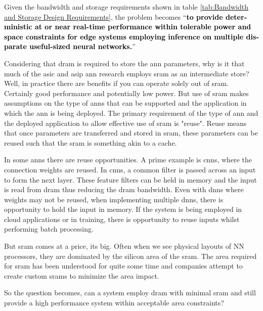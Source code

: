 Given the bandwidth and storage requirements shown in table \ref{tab:Bandwidth and Storage Design Requirements}, 
the problem becomes \hyphenquote{american}{\textbf{\textcolor{black}{to provide deterministic at or near real-time performance within tolerable power and space constraints for edge systems employing inference on multiple disparate useful-sized neural networks.}}}

\iffalse
Considering that \ac{dram} is required to store the \ac{ann} parameters, why is it that much of the \ac{asic} and \ac{asip} \ac{ann} research employs \ac{sram} as an intermediate store? Well, in practice there are benefits if you can operate solely out of \ac{sram}.
Certainly good performance and potentially low power.
But use of \ac{sram} makes assumptions on the type of \acp{ann} that can be supported and the application in which the \ac{ann} is being deployed.
The primary requirement of the type of \ac{ann} and the deployed application to allow effective use of \ac{sram} is "reuse". Reuse means that once parameters are transferred and stored in \ac{sram}, these parameters can be reused such that the \ac{sram} \iffalse isn't simply an intermediate memory but \fi is something akin to a cache.

In some \ac{ann}s there are reuse opportunities. A prime example is \acp{cnn}, where the connection weights are reused. In \acp{cnn}, a common filter is passed across an input to form the next layer. These feature filters can be held in memory and the input is read from \ac{dram} thus reducing the \ac{dram} bandwidth.
Even with \ac{dnn}s where weights may not be reused, when implementing multiple \ac{dnn}s, there is opportunity to hold the input in memory.
If the system is being employed in cloud applications or in training, there is opportunity to reuse inputs whilst performing batch processing.

But \ac{sram} comes at a price, its big. Often when we see physical layouts of NN processors, they are dominated by the silicon area of the \ac{sram}. The area required for \ac{sram} has been understood for quite some time and companies attempt to create custom \acp{sram} to minimize the area impact.

So the question becomes, can a system employ \ac{dram} with minimal \ac{sram} and still provide a high performance system within acceptable area constraints?

\iffalse
We believe a system can be designed with \ac{dram} as the primary processing store. This will require careful use of data structures to describe storage within \ac{dram} to ensure we make good use of the potential bandwidth. But there are other benefits we will take advantage of, but more about that later.
\fi


